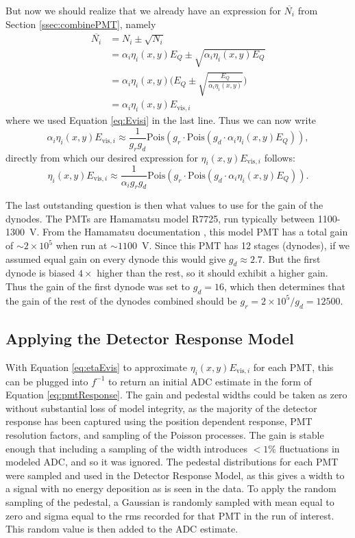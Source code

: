 But now we should realize that we already have an expression for $\overline{N_i}$ from Section \ref{ssec:combinePMT}, namely
\begin{align}
  \overline{N_i} &= N_i \pm \sqrt{N_i} \\
  &= \alpha_i \eta_i(x,y) E_Q \pm \sqrt{\alpha_i \eta_i(x,y) E_Q} \\
  &= \alpha_i \eta_i(x,y) \Bigg( E_Q \pm \sqrt{\frac{E_Q}{\alpha_i \eta_i(x,y)}}\Bigg) \\
  &= \alpha_i \eta_i(x,y) E_{\mathrm{vis},i} 
  \label{eq:bam}
\end{align}
where we used Equation \ref{eq:Evisi} in the last line. Thus we can now write
\begin{equation}
   \alpha_i \eta_i(x,y) E_{\mathrm{vis},i} \approx \frac{1}{g_rg_d}\mathrm{Pois}(g_r \cdot \mathrm{Pois}(g_d \cdot \alpha_i \eta_i(x,y) E_Q)),
  \label{eq:ntot4}
\end{equation}
directly from which our desired expression for $\eta_i(x,y) E_{\mathrm{vis},i}$ follows:
\begin{equation}
   \eta_i(x,y) E_{\mathrm{vis},i} \approx \frac{1}{\alpha_i g_rg_d}\mathrm{Pois}(g_r \cdot \mathrm{Pois}(g_d \cdot \alpha_i \eta_i(x,y) E_Q)).
  \label{eq:etaEvis}
\end{equation}

The last outstanding question is then what values to use for the gain of the dynodes. The PMTs are
Hamamatsu model R7725, run typically between 1100-1300~V. From the Hamamatsu documentation \cite{hamamatsu},
this model PMT has a total gain of $\sim2\times 10^5$ when run at $\sim1100$~V. Since this PMT has 12 stages (dynodes),
if we assumed equal gain on every dynode this would give $g_d\approx2.7$. But the first dynode is biased $4\times$ higher
than the rest, so it should exhibit a higher gain. Thus the gain of the first dynode was set to $g_d=16$, which then determines
that the gain of the rest of the dynodes combined should be $g_r = 2\times 10^5/g_d = 12500$.

\subsection{Applying the Detector Response Model}

With Equation \ref{eq:etaEvis} to approximate $\eta_i(x,y) E_{\mathrm{vis},i}$ for each PMT, this can be plugged into
$f^{-1}$ to return an initial ADC estimate in the form of Equation \ref{eq:pmtResponse}. The gain and pedestal
widths could be taken as zero without substantial loss of model integrity, as the majority of the detector
response has been captured using the position dependent response, PMT resolution factors, and sampling of the
Poisson processes. The gain is stable enough that including a sampling of the width introduces $<1\%$ fluctuations
in modeled ADC, and so it was ignored. The pedestal distributions for each PMT were sampled and used in the
Detector Response Model, as this gives a width to a signal with no energy deposition as is seen in the data.
To apply the random sampling of the pedestal, a Gaussian is randomly sampled with mean equal to zero and sigma equal
to the rms recorded for that PMT in the run of interest. This random value is then added to the ADC estimate. 

